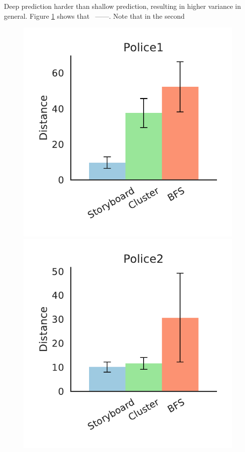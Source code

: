 Deep prediction harder than shallow prediction, resulting in higher variance in general.
Figure \ref{distance} shows that \system\ ------. 
Note that in the second 
\begin{figure}[bht]
\label{distance}
\centering
\includegraphics[scale=0.4]{figures/Police1.pdf}
\includegraphics[scale=0.4]{figures/Police2.pdf}

\end{figure}
